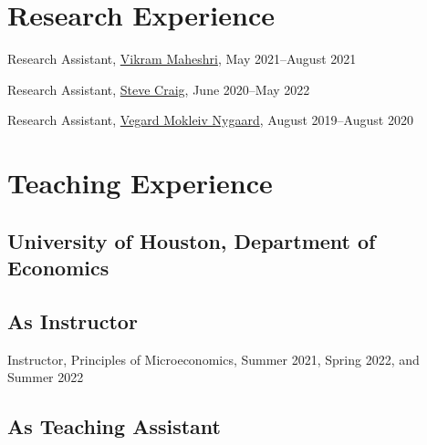 \documentclass[10pt,letterpaper]{article}
\renewenvironment{itemize}{
  \begin{list}{}{
    \setlength{\leftmargin}{1.5em}
  }
}{
  \end{list}
}
\begin{document}
\begin{itemize}

\section*{Research Experience}

\begin{itemize}
  \item Research Assistant,
  \href{https://vmaheshri.github.io/}{Vikram Maheshri},
  May 2021--August 2021

  \item Research Assistant,
  \href{https://www.uh.edu/class/economics/people/current-faculty/steve/}{Steve Craig},
  June 2020--May 2022
  \item Research Assistant,
  \href{https://sites.google.com/site/vegardmokleivnygaard/}{Vegard Mokleiv Nygaard},
  August 2019--August 2020
\end{itemize}

\section*{Teaching Experience}
\subsection*{University of Houston, Department of Economics}

\subsection*{As Instructor}

\begin{itemize}

\item Instructor, Principles of Microeconomics, Summer 2021, Spring 2022, and Summer 2022 %
\end{itemize}

\subsection*{As Teaching Assistant}

\begin{itemize}


\end{itemize}
\end{itemize}
\end{document}
